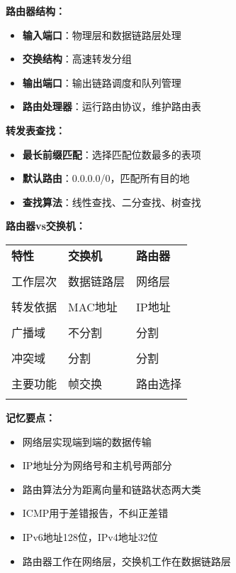 \documentclass[lang=cn,newtx,10pt,scheme=chinese]{../../elegantbook}
\begin{document}
\textbf{路由器结构：}
\begin{itemize}
  \item \textbf{输入端口}：物理层和数据链路层处理
  \item \textbf{交换结构}：高速转发分组
  \item \textbf{输出端口}：输出链路调度和队列管理
  \item \textbf{路由处理器}：运行路由协议，维护路由表
\end{itemize}

\textbf{转发表查找：}
\begin{itemize}
  \item \textbf{最长前缀匹配}：选择匹配位数最多的表项
  \item \textbf{默认路由}：0.0.0.0/0，匹配所有目的地
  \item \textbf{查找算法}：线性查找、二分查找、树查找
\end{itemize}

\textbf{路由器vs交换机：}
\begin{longtable}{@{}p{3cm}p{5cm}p{5cm}@{}}
\toprule
\textbf{特性} & \textbf{交换机} & \textbf{路由器} \\\\ \midrule
\endhead

工作层次 & 数据链路层 & 网络层 \\\\
转发依据 & MAC地址 & IP地址 \\\\
广播域 & 不分割 & 分割 \\\\
冲突域 & 分割 & 分割 \\\\
主要功能 & 帧交换 & 路由选择 \\\\

\bottomrule
\end{longtable}

\textbf{记忆要点：}
\begin{itemize}
  \item 网络层实现端到端的数据传输
  \item IP地址分为网络号和主机号两部分
  \item 路由算法分为距离向量和链路状态两大类
  \item ICMP用于差错报告，不纠正差错
  \item IPv6地址128位，IPv4地址32位
  \item 路由器工作在网络层，交换机工作在数据链路层
\end{itemize}
\end{document}
